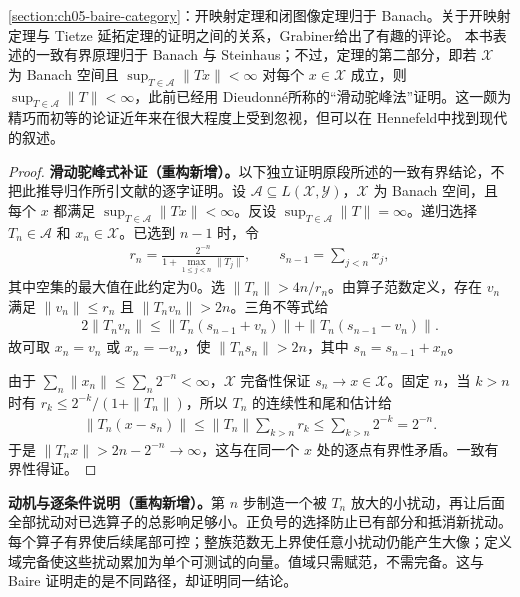 \documentclass[../../main.tex]{subfiles}
\begin{document}
\cref{section:ch05-baire-category}：开映射定理和闭图像定理归于 Banach\cite{folland-bib-009}。关于开映射定理与 Tietze 延拓定理的证明之间的关系，Grabiner\cite{folland-bib-058}给出了有趣的评论。
本书表述的一致有界原理归于 Banach 与 Steinhaus\cite{folland-bib-010}；不过，定理的第二部分，即若 $\mathscr X$ 为 Banach 空间且 $\sup_{T\in\mathscr A}\|Tx\|<\infty$ 对每个 $x\in\mathscr X$ 成立，则 $\sup_{T\in\mathscr A}\|T\|<\infty$，此前已经用 Dieudonné\cite{folland-bib-033}所称的“滑动驼峰法”证明。这一颇为精巧而初等的论证近年来在很大程度上受到忽视，但可以在 Hennefeld\cite{folland-bib-071}中找到现代的叙述。
\begin{proof}
\textbf{滑动驼峰式补证（重构新增）。}以下独立证明原段所述的一致有界结论，不把此推导归作所引文献的逐字证明。设 $\mathscr A\subseteq L(\mathscr X,\mathscr Y)$，$\mathscr X$ 为 Banach 空间，且每个 $x$ 都满足 $\sup_{T\in\mathscr A}\|Tx\|<\infty$。反设 $\sup_{T\in\mathscr A}\|T\|=\infty$。递归选择 $T_n\in\mathscr A$ 和 $x_n\in\mathscr X$。已选到 $n-1$ 时，令
\begin{align*}
r_n=\frac{2^{-n}}{1+\max_{1\leqslant j<n}\|T_j\|},
\qquad s_{n-1}=\sum_{j<n}x_j,
\end{align*}
其中空集的最大值在此约定为0。选 $\|T_n\|>4n/r_n$。由算子范数定义，存在 $v_n$ 满足 $\|v_n\|\leqslant r_n$ 且 $\|T_nv_n\|>2n$。三角不等式给
\begin{align*}
2\|T_nv_n\|\leqslant
\|T_n(s_{n-1}+v_n)\|+\|T_n(s_{n-1}-v_n)\|.
\end{align*}
故可取 $x_n=v_n$ 或 $x_n=-v_n$，使 $\|T_ns_n\|>2n$，其中 $s_n=s_{n-1}+x_n$。

由于 $\sum_n\|x_n\|\leqslant\sum_n2^{-n}<\infty$，$\mathscr X$ 完备性保证 $s_n\to x\in\mathscr X$。固定 $n$，当 $k>n$ 时有 $r_k\leqslant2^{-k}/(1+\|T_n\|)$，所以 $T_n$ 的连续性和尾和估计给
\begin{align*}
\|T_n(x-s_n)\|\leqslant\|T_n\|\sum_{k>n}r_k
\leqslant\sum_{k>n}2^{-k}=2^{-n}.
\end{align*}
于是 $\|T_nx\|>2n-2^{-n}\to\infty$，这与在同一个 $x$ 处的逐点有界性矛盾。一致有界性得证。
\end{proof}
\begin{remark}
\textbf{动机与逐条件说明（重构新增）。}第 $n$ 步制造一个被 $T_n$ 放大的小扰动，再让后面全部扰动对已选算子的总影响足够小。正负号的选择防止已有部分和抵消新扰动。每个算子有界使后续尾部可控；整族范数无上界使任意小扰动仍能产生大像；定义域完备使这些扰动累加为单个可测试的向量。值域只需赋范，不需完备。这与 Baire 证明走的是不同路径，却证明同一结论。
\end{remark}
\end{document}
